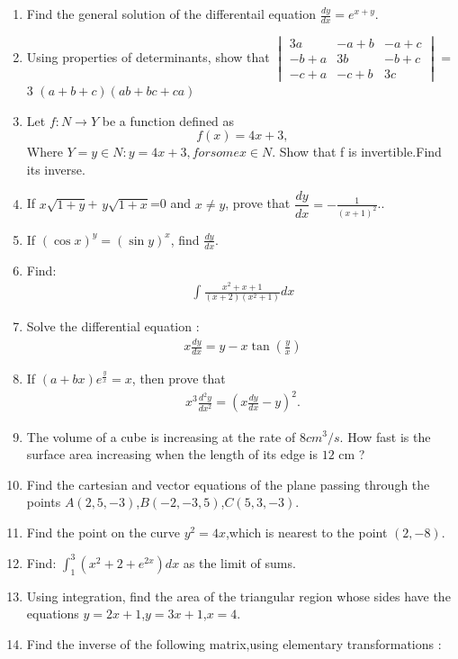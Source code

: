 \documentclass[2pt,-letter paper]{article}
\providecommand{\brak}[1]{\ensuremath{\left(#1\right)}}
\begin{document}
\begin{enumerate}
\item Find the general solution of the differentail equation $\frac{dy}{dx} = e^{x+y}$.
\item Using properties of determinants, show that
$\begin{vmatrix}
3a & -a + b & -a + c \\
 -b + a & 3b & -b + c \\
-c + a & -c + b & 3c 
 \end{vmatrix}$ = 3 \brak{a + b + c}\brak{ab + bc + ca}
\item Let $f : N \rightarrow Y$ be a function defined as 
\begin{equation}
 f(x) = 4x + 3,
\end{equation}
Where $Y = {y \in N : y = 4x + 3, for some x \in N}$. Show that f is invertible.Find its inverse.
\item If $x\sqrt{1+y}$+ $y\sqrt{1+x}$=0 and $x\neq y$, prove that $\dfrac{dy}{dx} = -\frac{1}{\brak{x+1}^2}$..
\item If $\brak{\cos x}^y = \brak{\sin y}^x$, find $\frac{dy}{dx}$.
\item Find: \begin{align*}\int{\frac{x^2+x+1}{\brak{x+2}\brak{x^2+1}}}dx\end{align*}
\item Solve the differential equation :
\begin{align*}
	x\frac{dy}{dx} = y - x\tan{\brak{\frac{y}{x}}}
\end{align*}
\item If $\brak{a + bx}e^\frac{y}{x}=x$, then prove that
\begin{align*}
x^3\frac{d^2y}{dx^2} = \brak{x\frac{dy}{dx}-y}^2.
\end{align*}
\item The volume of a cube is increasing at the rate of $8 cm^3/s$. How fast is the surface area increasing when the length of its edge is $12$ cm ?
\item Find the cartesian and vector equations of the plane passing through the points $A\brak{2,5,-3}$,$B\brak{-2,-3,5}$,$C\brak{5,3,-3}$.
\item Find the point on the curve $y^2 = 4x$,which is nearest to the point $\brak{2,-8}$.
\item Find: $\int_{1}^{3}{\brak{x^2+2+e^{2x}}}dx$ as the limit of sums.
\item Using integration, find the area of the triangular region whose sides have the equations $y = 2x + 1$,$y = 3x + 1$,$x = 4$.
\item Find the inverse of the following matrix,using elementary transformations :

\end{enumerate}
\end{document}
